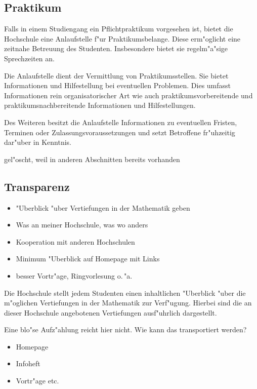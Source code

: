 \subsection{Praktikum}

Falls in einem Studiengang ein Pflichtpraktikum vorgesehen ist, bietet die Hochschule eine Anlaufstelle f"ur Praktikumsbelange. Diese erm"oglicht eine zeitnahe Betreuung des Studenten. Insbesondere bietet sie regelm"a"sige Sprechzeiten an.

Die Anlaufstelle dient der Vermittlung von Praktikumsstellen. Sie bietet Informationen und Hilfestellung bei eventuellen Problemen. Dies umfasst Informationen rein organisatorischer Art wie auch praktikumsvorbereitende und praktikumsnachbereitende Informationen und Hilfestellungen.

Des Weiteren besitzt die Anlaufstelle Informationen zu eventuellen Fristen, Terminen oder Zulassungsvoraussetzungen und setzt Betroffene fr"uhzeitig dar"uber in Kenntnis.

\begin{kcmt}\begin{komacmt}
gel"oscht, weil in anderen Abschnitten bereits vorhanden

\subsection{Transparenz}
	\begin{itemize}
		\item "Uberblick "uber Vertiefungen in der Mathematik geben
		\item Was an meiner Hochschule, was wo anders
		\item Kooperation mit anderen Hochschulen
		\item Minimum "Uberblick auf Homepage mit Links
		\item besser Vortr"age, Ringvorlesung o.\,"a.
	\end{itemize}


Die Hochschule stellt jedem Studenten einen inhaltlichen "Uberblick "uber die m"oglichen
Vertiefungen in der Mathematik zur Verf"ugung. Hierbei sind die an dieser
Hochschule angebotenen Vertiefungen ausf"uhrlich dargestellt.

	Eine blo"se Aufz"ahlung reicht hier nicht.
	Wie kann das transportiert werden?
	\begin{itemize}
		\item Homepage
		\item Infoheft
		\item Vortr"age etc.
	\end{itemize}
\end{komacmt}\end{kcmt}

